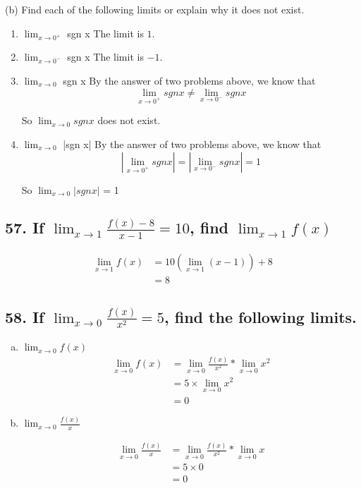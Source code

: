 \documentclass{article}
\begin{document}
    (b) Find each of the following limits or explain why it does not exist.

    \begin{enumerate}
        \item $\lim_{x \to 0^+}$ sgn x
        The limit is $1$.
        \item $\lim_{x \to 0^-}$ sgn x
        The limit is $-1$.
        \item $\lim_{x \to 0}$ sgn x
        By the answer of two problems above, we know that $$\lim_{x \to 0^+} sgn x \not = \lim_{x \to 0^-} sgn x$$

        So $\lim_{x \to 0} sgn x$ does not exist.
        \item $\lim_{x \to 0}$ |sgn x|
        By the answer of two problems above, we know that $$|\lim_{x \to 0^+} sgn x| = |\lim_{x \to 0^-} sgn x| = 1$$

        So $\lim_{x \to 0}|sgn x|$ = 1
    \end{enumerate}

    \subsection*{57. If $\lim_{x \to 1}\frac{f(x) - 8}{x - 1} = 10$, find $\lim_{x \to 1}f(x)$}

    $$
    \begin{aligned}
        \lim_{x \to 1}f(x) &= 10(\lim_{x \to 1}(x - 1)) + 8 \\
        &= 8
    \end{aligned}
    $$

    \subsection*{58. If $\lim_{x \to 0}\frac{f(x)}{x^2} = 5$, find the following limits.}

    \begin{enumerate}[a.]
        \item $\lim_{x \to 0}f(x)$
        $$
        \begin{aligned}
            \lim_{x \to 0}f(x) &= \lim_{x \to 0}\frac{f(x)}{x^2} * \lim_{x  \to 0}x^2 \\
            &= 5 \times \lim_{x \to 0}x^2 \\
            &= 0
        \end{aligned}
        $$
        \item $\lim_{x \to 0}\frac{f(x)}{x}$

        $$
        \begin{aligned}
            \lim_{x \to 0}\frac{f(x)}{x} &= \lim_{x \to 0}\frac{f(x)}{x^2} * \lim_{x \to 0}x \\
            &= 5 \times 0 \\
            &= 0
        \end{aligned}
        $$
    \end{enumerate}
\end{document}
